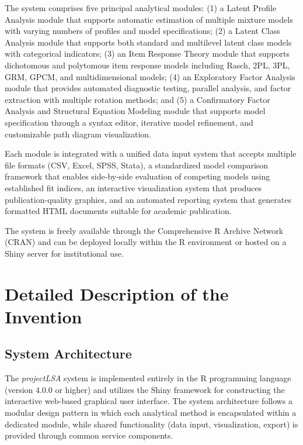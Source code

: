 \documentclass[12pt,a4paper]{article}
\begin{document}
The system comprises five principal analytical modules: (1) a Latent Profile Analysis module that supports automatic estimation of multiple mixture models with varying numbers of profiles and model specifications; (2) a Latent Class Analysis module that supports both standard and multilevel latent class models with categorical indicators; (3) an Item Response Theory module that supports dichotomous and polytomous item response models including Rasch, 2PL, 3PL, GRM, GPCM, and multidimensional models; (4) an Exploratory Factor Analysis module that provides automated diagnostic testing, parallel analysis, and factor extraction with multiple rotation methods; and (5) a Confirmatory Factor Analysis and Structural Equation Modeling module that supports model specification through a syntax editor, iterative model refinement, and customizable path diagram visualization.

Each module is integrated with a unified data input system that accepts multiple file formats (CSV, Excel, SPSS, Stata), a standardized model comparison framework that enables side-by-side evaluation of competing models using established fit indices, an interactive visualization system that produces publication-quality graphics, and an automated reporting system that generates formatted HTML documents suitable for academic publication.

The system is freely available through the Comprehensive R Archive Network (CRAN) and can be deployed locally within the R environment or hosted on a Shiny server for institutional use.

\section{Detailed Description of the Invention}

\subsection{System Architecture}

The \textit{projectLSA} system is implemented entirely in the R programming language (version 4.0.0 or higher) and utilizes the Shiny framework for constructing the interactive web-based graphical user interface. The system architecture follows a modular design pattern in which each analytical method is encapsulated within a dedicated module, while shared functionality (data input, visualization, export) is provided through common service components.
\end{document}
